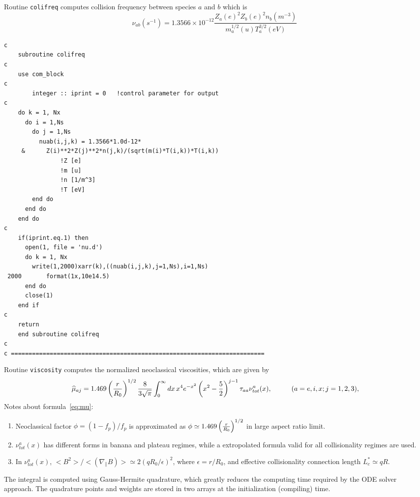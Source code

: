 Routine {\tt colifreq} computes collision frequency between species $a$ and $b$ which is
\begin{equation}
\nu_{ab}(s^{-1})=1.3566\times 10^{-12}
		\frac{\displaystyle Z_a(e)^2Z_b(e)^2n_b(m^{-3})}
		{\displaystyle m_a^{1/2}(u)T_a^{3/2}(eV)}\ 
\label{eq:nu}
\end{equation}
\begin{verbatim}
c
	subroutine colifreq
c
	use com_block
c
        integer :: iprint = 0   !control parameter for output
c
	do k = 1, Nx
	  do i = 1,Ns
	    do j = 1,Ns
	      nuab(i,j,k) = 1.3566*1.0d-12*
     &		Z(i)**2*Z(j)**2*n(j,k)/(sqrt(m(i)*T(i,k))*T(i,k))
				!Z [e]
				!m [u]
				!n [1/m^3]
				!T [eV]
	    end do
	  end do
	end do
c
	if(iprint.eq.1) then
	  open(1, file = 'nu.d')
	  do k = 1, Nx
	    write(1,2000)xarr(k),((nuab(i,j,k),j=1,Ns),i=1,Ns)
 2000	    format(1x,10e14.5)
	  end do
	  close(1)
	end if
c	
	return
	end subroutine colifreq
c
c ========================================================================
\end{verbatim}
Routine {\tt viscosity} computes the normalized neoclassical viscosities, which are given by~\cite{hirshman81}
\begin{equation}
\widehat\mu_{aj}=1.469\left({r\over R_0}\right)^{1/2}{8\over
3\sqrt\pi}\int_0^\infty dx\,x^4 e^{-x^2}\left(x^2-{5\over
2}\right)^{j-1}\tau_{aa}\nu_{tot}^a(x), \hbox{\hskip
1cm}(a=e,i,x;j=1,2,3),\label{eq:mu}
\end{equation}
Notes about formula~\ref{eq:mu}:
\begin{enumerate}
\item Neoclassical factor $\phi=(1-f_p)/f_p$ is approximated as $\phi\simeq 
1.469\left({r\over R_0}\right)^{1/2}$ in large aspect ratio limit. 
\item $\nu_{tot}^a(x)$ has different forms in banana and plateau regimes, while a extropolated formula valid for all collisionality regimes are used.
\item In $\nu_{tot}^a(x)$, $<B^2>/<(\nabla_{\parallel}B)>\simeq 2(qR_0/\epsilon)^2$, where $\epsilon=r/R_0$, and effective collisionality connection length $L_c^*\simeq qR$.
\end{enumerate}
The integral is computed using Gauss-Hermite quadrature, which greatly reduces the computing time required by the ODE solver approach. The quadrature points and weights are stored in two arrays at the initialization (compiling) time.
